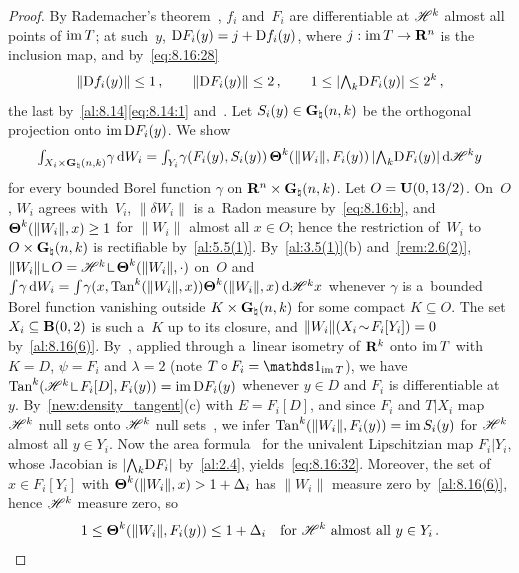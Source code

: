 \begin{proof}
    By Rademacher's theorem~\cite[3.1.6]{Federer1969}, $f_i$ and~$F_i$ are differentiable at
    $\mathscr{H}^{k}$ almost all points of $\operatorname{im} T$; at such~$y$, $\mathrm{D} F_i(y) = j + \mathrm{D} f_i(y)$, where
    $j : \operatorname{im} T \to \mathbf{R}^{n}$ is the inclusion map, and by~\eqref{eq:8.16:28}
    \begin{equation}
        \label{eq:8.16:31}
        \|\mathrm{D} f_i(y)\| \le 1 \,, \qquad \|\mathrm{D} F_i(y)\| \le 2 \,, \qquad 1 \le |{\textstyle\boldsymbol{\bigwedge}}_{{k}}
        \mathrm{D} F_i(y)| \le 2^{k} \,,
    \end{equation}
    the last by~\ref{al:8.14}\eqref{eq:8.14:1} and~\cite[1.7.6]{Federer1969}. Let $S_i(y) \in
    \mathbf{G}_{\natural}(n,k)$ be the orthogonal projection onto $\operatorname{im} \mathrm{D} F_i(y)$. We show
    \begin{equation}
        \label{eq:8.16:32}
        {\textstyle\int_{X_i \times \mathbf{G}_{\natural}(n,k)}^{}} \gamma \,\mathrm{d} W_i = {\textstyle\int_{Y_i}^{}} \gamma(F_i(y),
        S_i(y)) \, \boldsymbol{\Theta}^{k}(\|W_i\|,F_i(y)) \, |{\textstyle\boldsymbol{\bigwedge}}_{{k}} \mathrm{D} F_i(y)| \,\mathrm{d}
        \mathscr{H}^{k} y
    \end{equation}
    for every bounded Borel function $\gamma$ on $\mathbf{R}^{n} \times \mathbf{G}_{\natural}(n,k)$. Let $O =
    \mathbf{U}(0,13/2)$. On~$O$, $W_i$ agrees with~$V_i$, $\|\delta W_i\|$ is a~Radon measure
    by~\eqref{eq:8.16:b}, and $\boldsymbol{\Theta}^{k}(\|W_i\|,x) \ge 1$ for $\|W_i\|$ almost all $x \in
    O$; hence the restriction of~$W_i$ to $O \times \mathbf{G}_{\natural}(n,k)$ is rectifiable
    by~\ref{al:5.5(1)}. By~\ref{al:3.5(1)}(b) and~\ref{rem:2.6(2)}, $\|W_i\| \restrict O = \HM^{\vdim}
    \restrict \density^{\vdim}(\|W_i\|,\cdot)$ on~$O$ and ${\textstyle\int_{}^{}} \gamma \,\mathrm{d} W_i =
    {\textstyle\int_{}^{}} \gamma(x, \operatorname{Tan}^{k}(\|W_i\|,x)) \boldsymbol{\Theta}^{k}(\|W_i\|,x) \,\mathrm{d} \mathscr{H}^{k} x$
    whenever $\gamma$ is a~bounded Borel function vanishing outside $K \times \mathbf{G}_{\natural}(n,k)$
    for some compact $K \subseteq O$. The set $X_i \subseteq \mathbf{B}(0,2)$ is such a~$K$ up to its
    closure, and $\|W_i\|(X_i \!\sim\! F_i[Y_i]) = 0$ by~\ref{al:8.16(6)}. By~\cite[3.2.17]{Federer1969},
    applied through a~linear isometry of $\mathbf{R}^{k}$ onto $\operatorname{im} T$ with $K = D$, $\psi = F_i$ and
    $\lambda = 2$ (note $T \circ F_i = \id{\im T}$), we have $\Tan^{\vdim}(\HM^{\vdim} \restrict
    F_i[D], F_i(y)) = \im \uD F_i(y)$ whenever $y \in D$ and $F_i$ is differentiable at~$y$.
    By~\ref{new:density_tangent}(c) with $E = F_i[D]$, and since $F_i$ and $T | X_i$ map
    $\mathscr{H}^{k}$ null sets onto $\mathscr{H}^{k}$ null sets~\cite[2.10.11]{Federer1969}, we infer
    $\operatorname{Tan}^{k}(\|W_i\|, F_i(y)) = \operatorname{im} S_i(y)$ for $\mathscr{H}^{k}$ almost all $y \in Y_i$. Now the
    area formula~\cite[3.2.3, 3.2.5]{Federer1969} for the univalent Lipschitzian map $F_i | Y_i$,
    whose Jacobian is $|{\textstyle\boldsymbol{\bigwedge}}_{{k}} \mathrm{D} F_i|$ by~\ref{al:2.4}, yields~\eqref{eq:8.16:32}.
    Moreover, the set of $x \in F_i[Y_i]$ with $\boldsymbol{\Theta}^{k}(\|W_i\|,x) > 1 + \Delta_i$ has
    $\|W_i\|$ measure zero by~\ref{al:8.16(6)}, hence $\mathscr{H}^{k}$ measure zero, so
    \begin{equation}
        \label{eq:8.16:32a}
        1 \le \boldsymbol{\Theta}^{k}(\|W_i\|, F_i(y)) \le 1 + \Delta_i \quad \text{for $\mathscr{H}^{k}$ almost
        all $y \in Y_i$} \,.
    \end{equation}


\end{proof}
